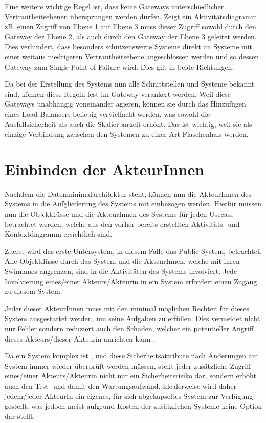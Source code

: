 Eine weitere wichtige Regel ist, dass keine Gateways unterschiedlicher Vertrautheitsebenen übersprungen werden dürfen. Zeigt ein Aktivitätsdiagramm zB. einen Zugriff von Ebene 1 auf Ebene 3 muss dieser Zugriff sowohl durch den Gateway der Ebene 2, als auch durch den Gateway der Ebene 3 geleitet werden. Dies verhindert, dass besonders schützenswerte Systeme direkt an Systeme mit einer weitaus niedrigeren Vertrautheitsebene angeschlossen werden und so dessen Gateway zum Single Point of Failure wird. Dies gilt in beide Richtungen.

Da bei der Erstellung des Systems nun alle Schnittstellen und Systeme bekannt sind, können diese Regeln fest im Gateway verankert werden. Weil diese Gateways unabhängig voneinander agieren, können sie durch das Hinzufügen eines Load Balancers beliebig vervielfacht werden, was sowohl die Ausfallsicherheit als auch die Skalierbarkeit erhöht. Das ist wichtig, weil sie als einzige Verbindung zwischen den Systemen zu einer Art Flaschenhals werden.

\section{Einbinden der AkteurInnen}
Nachdem die Datenminimalarchitektur steht, können nun die AkteurInnen des Systems in die Aufgliederung des Systems mit einbezogen werden. Hierfür müssen nun die Objektflüsse und die AkteurInnen des Systems für jeden Usecase betrachtet werden, welche aus den vorher bereits erstellten Aktivitäts- und Kontextdiagramm ersichtlich sind.

Zuerst wird das erste Untersystem, in diesem Falle das Public System, betrachtet. Alle Objektflüsse durch das System und die AkteurInnen, welche mit ihren Swimlanes angrenzen, sind in die Aktivitäten des Systems involviert. Jede Involvierung eines/einer Akteurs/Akteurin in ein System erfordert einen Zugang zu diesem System.

Jeder dieser AkteurInnen muss mit den minimal möglichen Rechten für dieses System ausgestattet werden, um seine Aufgaben zu erfüllen. Dies vermeidet nicht nur Fehler sondern reduziert auch den Schaden, welcher ein potentieller Angriff dieses Akteurs/dieser Akteurin anrichten kann \cite[1. A]{leastpriv}.

Da ein System komplex ist \cite[S. 7]{softarch}, und diese Sicherheitsattribute nach Änderungen am System immer wieder überprüft werden müssen, stellt jeder zusätzliche Zugriff eines/einer Akteurs/Akteurin nicht nur ein Sicherheitsrisiko dar, sondern erhöht auch den Test- und damit den Wartungsaufwand. Idealerweise wird daher jedem/jeder AkteurIn ein eigenes, für sich abgekapseltes System zur Verfügung gestellt, was jedoch meist aufgrund Kosten der zusätzlichen Systeme keine Option dar stellt.

